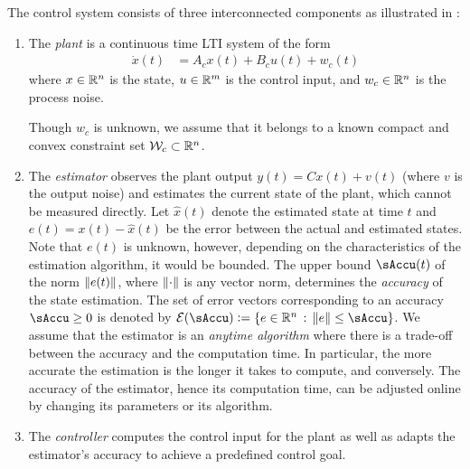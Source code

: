 
The control system consists of three interconnected components as
illustrated in :
\begin{enumerate}
\item The \emph{plant} is a continuous time LTI system of the form
\begin{align}
\dot{x}(t) & =A_{c}x(t)+B_{c}u(t)+w_{c}(t)\label{eq:plant-cont-model}
\end{align}
where $x\in\mathbb{R}^{n}$ is the state, $u\in\mathbb{R}^{m}$ is the control input,
and $w_{c}\in\mathbb{R}^{n}$ is the process noise. 

Though $w_{c}$ is unknown, we assume that it belongs to
a known compact and convex constraint set $\mathcal{W}_{c}\subset\mathbb{R}^{n}$.
%
\item The \emph{estimator} observes the plant output $y(t)=Cx(t)+v(t)$ (where $v$ is the output noise) and estimates the current state of the plant, which cannot be measured directly. %
  Let $\hat{x}(t)$ denote the estimated state at time $t$ and $e(t)=x(t)-\hat{x}(t)$ be the error between the actual and estimated states. Note that $e(t)$ is unknown, however, depending on the characteristics of the estimation algorithm, it would be bounded. The upper bound $\sAccu(t)$ of the norm $\left\lVert e(t) \right\rVert$, where $\left\lVert \cdot \right\rVert$ is any vector norm, determines the \emph{accuracy} of the state estimation.
  The set of error vectors corresponding to an accuracy $\sAccu\geq0$ is denoted by $\ESet(\sAccu)\definedas\{e\in\RR^{n}\SuchThat\norm{e}\leq\sAccu\}$.  We assume that the estimator is an \textit{anytime algorithm} where there is a trade-off between the accuracy and the computation time.
  In particular, the more accurate the estimation is the longer it takes to compute, and conversely.
  The accuracy of the estimator, hence its computation time, can be adjusted online by changing its parameters or its algorithm.


\item The \emph{controller} computes the control input for the plant as well as
adapts the estimator's accuracy to achieve a predefined control goal.
\end{enumerate}

